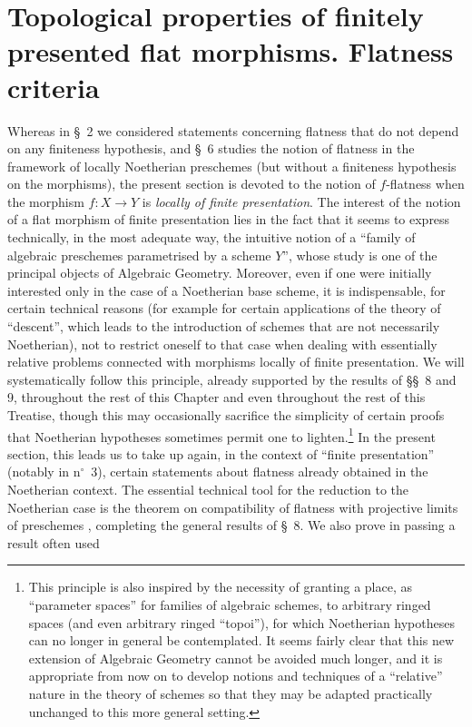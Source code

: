 \setcounter{section}{10}
\section{Topological properties of finitely presented flat morphisms. Flatness criteria}
\label{section:IV.11}


Whereas in \S~2 we considered statements concerning flatness that do not depend
on any finiteness hypothesis, and \S~6 studies the notion of flatness in the
framework of locally Noetherian preschemes (but without a finiteness hypothesis
on the morphisms), the present section is devoted to the notion of
$f$-flatness when the morphism $f:X\to Y$ is \emph{locally of finite
presentation}. The interest of the notion of a flat morphism of finite
presentation lies in the fact that it seems to express technically, in the
most adequate way, the intuitive notion of a ``family of algebraic preschemes
parametrised by a scheme $Y$'', whose study is one of the principal objects of
Algebraic Geometry. Moreover, even if one were initially interested only in
the case of a Noetherian base scheme, it is indispensable, for certain
technical reasons (for example for certain applications of the theory of
``descent'', which leads to the introduction of schemes that are not
necessarily Noetherian), not to restrict oneself to that case when dealing
with essentially relative problems connected with morphisms locally of finite
presentation. We will systematically follow this principle, already supported
by the results of \S\S~8 and 9, throughout the rest of this Chapter and even
throughout the rest of this Treatise, though this may occasionally sacrifice
the simplicity of certain proofs that Noetherian hypotheses sometimes permit
one to lighten.\footnote{This principle is also inspired by the necessity of
granting a place, as ``parameter spaces'' for families of algebraic schemes,
to arbitrary ringed spaces (and even arbitrary ringed ``topoi''), for which
Noetherian hypotheses can no longer in general be contemplated. It seems
fairly clear that this new extension of Algebraic Geometry cannot be avoided
much longer, and it is appropriate from now on to develop notions and
techniques of a ``relative'' nature in the theory of schemes so that they may
be adapted practically unchanged to this more general setting.} In the
present section, this leads us to take up again, in the context of ``finite
presentation'' (notably in n$^\circ$~3), certain statements about flatness
already obtained in the Noetherian context. The essential technical tool for
the reduction to the Noetherian case is the theorem on compatibility of
flatness with projective limits of preschemes , completing the
general results of \S~8. We also prove in passing  a result
often used

